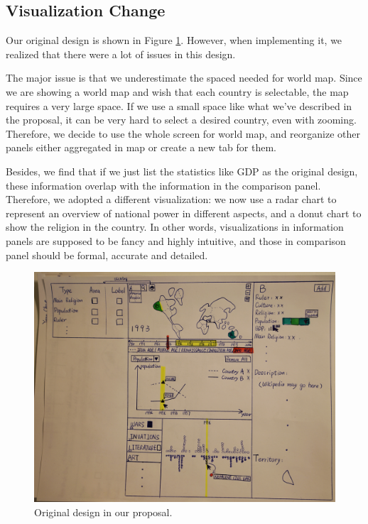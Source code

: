 \documentclass[12pt, fullpage,letterpaper]{article}
\begin{document}
    \subsection{Visualization Change}
        Our original design is shown in Figure \ref{fig:original}. However, when implementing it, we realized that there were a lot of issues in this design.

        The major issue is that we underestimate the spaced needed for world map. Since we are showing a world map and wish that
        each country is selectable, the map requires a very large space. If we use a small space like what we've described in the proposal, it can be very hard to select a desired country, even with zooming.
        Therefore, we decide to use the whole screen for world map, and reorganize other panels either aggregated in map or create a new tab for them.

        Besides, we find that if we just list the statistics like GDP as the original design, these information overlap with the information in the comparison panel.
        Therefore, we adopted a different visualization: we now use a radar chart to represent an overview of national power in different aspects,
        and a donut chart to show the religion in the country. In other words, visualizations in information panels are supposed to be fancy and highly intuitive,
        and those in comparison panel should be formal, accurate and detailed.
\begin{figure}[h!]
    \begin{center}
        \includegraphics[width=\textwidth]{figs/original.jpg}
        \caption{Original design in our proposal.}
        \label{fig:original}
    \end{center}
\end{figure}
\newpage
\end{document}
